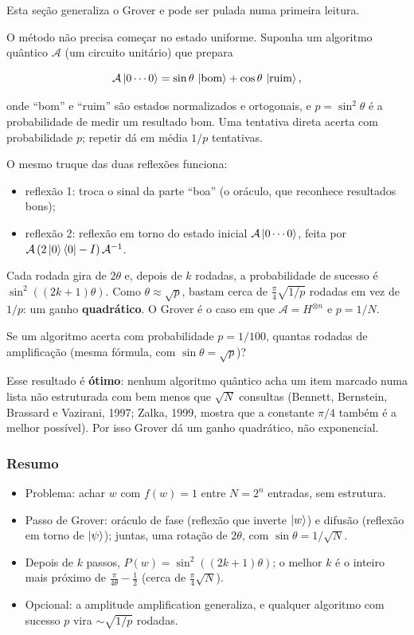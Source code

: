 Esta seção generaliza o Grover e pode ser pulada numa primeira leitura.

O método não precisa começar no estado uniforme. Suponha um algoritmo quântico \(\mathcal A\) (um circuito unitário) que prepara

\[
\mathcal A\left|{0\cdots0}\right>=\sin\theta\,\left|{\text{bom}}\right>+\cos\theta\,\left|{\text{ruim}}\right>,
\]

onde ``bom'' e ``ruim'' são estados normalizados e ortogonais, e \(p=\sin^2\theta\) é a probabilidade de medir um resultado bom. Uma tentativa direta acerta com probabilidade \(p\); repetir dá em média \(1/p\) tentativas.

O mesmo truque das duas reflexões funciona:

\begin{itemize}
\tightlist
\item
  reflexão 1: troca o sinal da parte ``boa'' (o oráculo, que reconhece resultados bons);
\item
  reflexão 2: reflexão em torno do estado inicial \(\mathcal A\left|{0\cdots0}\right>\), feita por \(\mathcal A\,(2\left|{0}\right>\left<{0}\right|-I)\,\mathcal A^{-1}\).
\end{itemize}

Cada rodada gira de \(2\theta\) e, depois de \(k\) rodadas, a probabilidade de sucesso é \(\sin^2((2k+1)\theta)\). Como \(\theta\approx\sqrt p\), bastam cerca de \(\tfrac\pi4\sqrt{1/p}\) rodadas em vez de \(1/p\): um ganho \textbf{quadrático}. O Grover é o caso em que \(\mathcal A=H^{\otimes n}\) e \(p=1/N\).

Se um algoritmo acerta com probabilidade \(p=1/100\), quantas rodadas de amplificação (mesma fórmula, com \(\sin\theta=\sqrt p\))?

Esse resultado é \textbf{ótimo}: nenhum algoritmo quântico acha um item marcado numa lista não estruturada com bem menos que \(\sqrt N\) consultas (Bennett, Bernstein, Brassard e Vazirani, 1997; Zalka, 1999, mostra que a constante \(\pi/4\) também é a melhor possível). Por isso Grover dá um ganho quadrático, não exponencial.

\subsubsection{Resumo}\label{resumo}

\begin{itemize}
\tightlist
\item
  Problema: achar \(w\) com \(f(w)=1\) entre \(N=2^n\) entradas, sem estrutura.
\item
  Passo de Grover: oráculo de fase (reflexão que inverte \(\left|{w}\right>\)) e difusão (reflexão em torno de \(\left|{\psi}\right>\)); juntas, uma rotação de \(2\theta\), com \(\sin\theta=1/\sqrt N\).
\item
  Depois de \(k\) passos, \(P(w)=\sin^2((2k+1)\theta)\); o melhor \(k\) é o inteiro mais próximo de \(\tfrac{\pi}{4\theta}-\tfrac12\) (cerca de \(\tfrac\pi4\sqrt N\)).
\item
  Opcional: a amplitude amplification generaliza, e qualquer algoritmo com sucesso \(p\) vira \(\sim\sqrt{1/p}\) rodadas.
\end{itemize}

